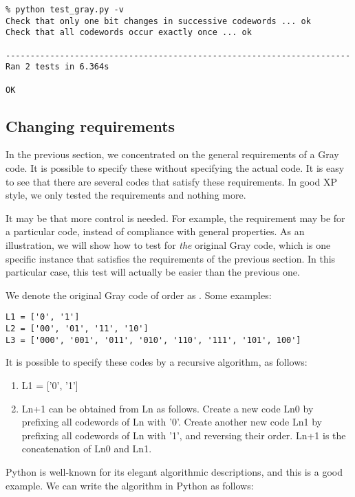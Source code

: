 \begin{verbatim}
% python test_gray.py -v
Check that only one bit changes in successive codewords ... ok
Check that all codewords occur exactly once ... ok

----------------------------------------------------------------------
Ran 2 tests in 6.364s

OK
\end{verbatim}



\subsection{Changing requirements}

In the previous section, we concentrated on the general requirements
of a Gray code. It is possible to specify these without specifying the
actual code. It is easy to see that there are several codes
that satisfy these requirements. In good XP style, we only tested
the requirements and nothing more.

It may be that more control is needed. For example, the requirement
may be for a particular code, instead of compliance with general
properties. As an illustration, we will show how to test for
\emph{the} original Gray code, which is one specific instance that
satisfies the requirements of the previous section. In this particular
case, this test will actually be easier than the previous one.

We denote the original Gray code of order  as . Some
examples: 

\begin{verbatim}
L1 = ['0', '1']
L2 = ['00', '01', '11', '10']
L3 = ['000', '001', '011', '010', '110', '111', '101', 100']
\end{verbatim}

It is possible to specify these codes by a recursive algorithm, as
follows:

\begin{enumerate}
\item L1 = ['0', '1']
\item Ln+1 can be obtained from Ln as follows. Create a new code Ln0 by
prefixing all codewords of Ln with '0'. Create another new code Ln1 by
prefixing all codewords of Ln with '1', and reversing their
order. Ln+1 is the concatenation of Ln0 and Ln1.
\end{enumerate}

Python is well-known  for its elegant algorithmic
descriptions, and this is a good example. We can write the algorithm
in Python as follows:

